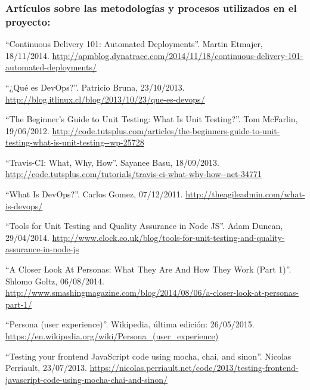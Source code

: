 
\subsubsection*{Artículos sobre las metodologías y procesos utilizados en el proyecto:}

 ``Continuous Delivery 101: Automated Deployments''. Martin Etmajer, 18/11/2014. \url{http://apmblog.dynatrace.com/2014/11/18/continuous-delivery-101-automated-deployments/}

 ``¿Qué es DevOps?''. Patricio Bruna, 23/10/2013. \url{http://blog.itlinux.cl/blog/2013/10/23/que-es-devops/}

 ``The Beginner’s Guide to Unit Testing: What Is Unit Testing?''. Tom McFarlin, 19/06/2012. \url{http://code.tutsplus.com/articles/the-beginners-guide-to-unit-testing-what-is-unit-testing--wp-25728}

 ``Travis-CI: What, Why, How''. Sayanee Basu, 18/09/2013. \url{http://code.tutsplus.com/tutorials/travis-ci-what-why-how--net-34771}

 ``What Is DevOps?''. Carlos Gomez, 07/12/2011. \url{http://theagileadmin.com/what-is-devops/}

 ``Tools for Unit Testing and Quality Assurance in Node JS''. Adam Duncan, 29/04/2014. \url{http://www.clock.co.uk/blog/tools-for-unit-testing-and-quality-assurance-in-node-js}

 ``A Closer Look At Personas: What They Are And How They Work (Part 1)''. Shlomo Goltz, 06/08/2014. \url{http://www.smashingmagazine.com/blog/2014/08/06/a-closer-look-at-personas-part-1/}

 ``Persona (user experience)''. Wikipedia, última edición: 26/05/2015. \url{https://en.wikipedia.org/wiki/Persona_(user_experience)}

 ``Testing your frontend JavaScript code using mocha, chai, and sinon''. Nicolas Perriault, 23/07/2013. \url{https://nicolas.perriault.net/code/2013/testing-frontend-javascript-code-using-mocha-chai-and-sinon/}

\bigskip
